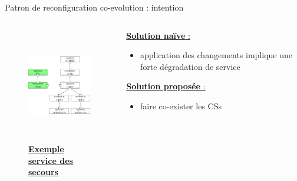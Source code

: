 \begin{frame}{Patron de reconfiguration co-evolution : intention}
\begin{columns}
\begin{column}{0.6\textwidth}
\begin{figure}
\centering
\includegraphics[height=5cm]{imgs/fig_rearchitecture}
\caption{\underline{\textbf{Exemple service des secours}}}
\end{figure}
\end{column}
\begin{column}{0.4\textwidth}
\underline{\textbf{Solution naïve} :}
\begin{itemize}
    \item application des changements implique une forte dégradation de service
\end{itemize}
\vspace{5mm}
\underline{\textbf{Solution proposée} :}
\begin{itemize}
    \item faire co-exister les CSs
\end{itemize}
\end{column}
\end{columns}
\end{frame}

